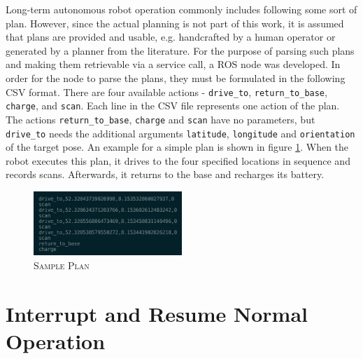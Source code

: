 \documentclass[english, master, utf8]{base/thesis_KBS}
\newcommand{\code}[1]{\colorbox{light-gray}{\texttt{#1}}}
\begin{document}
Long-term autonomous robot operation commonly includes following some sort of plan. However, since the actual planning is not part of this work, it is assumed that
plans are provided and usable, e.g. handcrafted by a human operator or generated by a planner from the literature.
For the purpose of parsing such plans and making them retrievable via a service call, a ROS node was developed.
In order for the node to parse the plans, they must be formulated in the following CSV format.
There are four available actions - \code{drive\_to}, \code{return\_to\_base}, \code{charge}, and \code{scan}.
Each line in the CSV file represents one action of the plan. The actions \code{return\_to\_base}, \code{charge} and \code{scan} have no parameters,
but \code{drive\_to} needs the additional arguments \code{latitude}, \code{longitude} and \code{orientation} of the target pose.
An example for a simple plan is shown in figure \ref{fig:plan_example}. 
When the robot executes this plan, it drives to the four specified locations in sequence and records scans.
Afterwards, it returns to the base and recharges its battery.
\begin{figure}[H]
    \centering
    \includegraphics[width=0.5\textwidth]{pics/plan_example.png}
    \caption{\textsc{Sample Plan}}
    \label{fig:plan_example}
\end{figure}
\noindent

\section{Interrupt and Resume Normal Operation}
\end{document}
